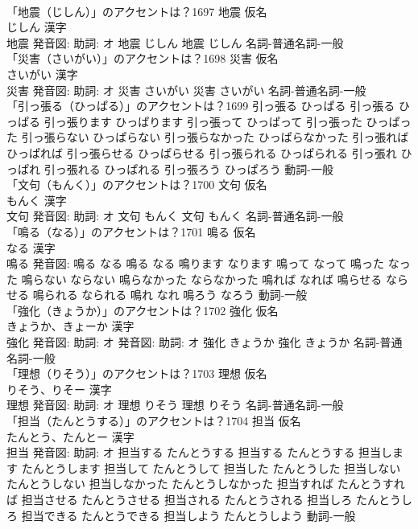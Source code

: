 \documentclass[8pt]{extreport}
\begin{document}
\begin{CJK}{UTF8}{min}
\\	「地震（じしん）」のアクセントは？1697	地震 仮名　
\\	じしん 漢字　
\\	地震 発音図: 助詞: オ	地震 じしん		地震 じしん				名詞-普通名詞-一般 
\\	「災害（さいがい）」のアクセントは？1698	災害 仮名　
\\	さいがい 漢字　
\\	災害 発音図: 助詞: オ	災害 さいがい		災害 さいがい				名詞-普通名詞-一般 
\\	「引っ張る（ひっぱる）」のアクセントは？1699		引っ張る ひっぱる		引っ張る ひっぱる 引っ張ります ひっぱります 引っ張って ひっぱって 引っ張った ひっぱった 引っ張らない ひっぱらない 引っ張らなかった ひっぱらなかった 引っ張れば ひっぱれば 引っ張らせる ひっぱらせる 引っ張られる ひっぱられる 引っ張れ ひっぱれ 引っ張れる ひっぱれる 引っ張ろう ひっぱろう				動詞-一般 
\\	「文句（もんく）」のアクセントは？1700	文句 仮名　
\\	もんく 漢字　
\\	文句 発音図: 助詞: オ	文句 もんく		文句 もんく				名詞-普通名詞-一般 
\\	「鳴る（なる）」のアクセントは？1701	鳴る 仮名　
\\	なる 漢字　
\\	鳴る 発音図:	鳴る なる		鳴る なる 鳴ります なります 鳴って なって 鳴った なった 鳴らない ならない 鳴らなかった ならなかった 鳴れば なれば 鳴らせる ならせる 鳴られる なられる 鳴れ なれ 鳴ろう なろう				動詞-一般 
\\	「強化（きょうか）」のアクセントは？1702	強化 仮名　
\\	きょうか、きょーか 漢字　
\\	強化 発音図: 助詞: オ 発音図: 助詞: オ	強化 きょうか		強化 きょうか				名詞-普通名詞-一般 
\\	「理想（りそう）」のアクセントは？1703	理想 仮名　
\\	りそう、りそー 漢字　
\\	理想 発音図: 助詞: オ	理想 りそう		理想 りそう				名詞-普通名詞-一般 
\\	「担当（たんとうする）」のアクセントは？1704	担当 仮名　
\\	たんとう、たんとー 漢字　
\\	担当 発音図: 助詞: オ	担当する たんとうする		担当する たんとうする 担当します たんとうします 担当して たんとうして 担当した たんとうした 担当しない たんとうしない 担当しなかった たんとうしなかった 担当すれば たんとうすれば 担当させる たんとうさせる 担当される たんとうされる 担当しろ たんとうしろ 担当できる たんとうできる 担当しよう たんとうしよう				動詞-一般 

\end{CJK}
\end{document}
